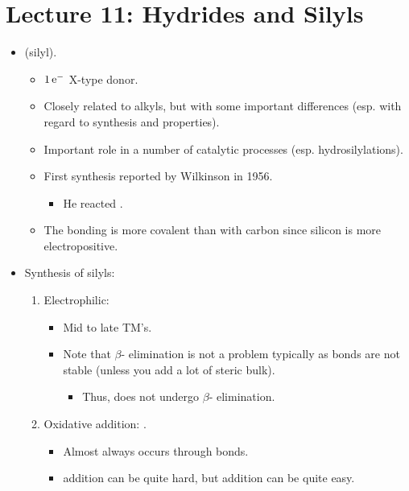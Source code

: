 \documentclass[../notes.tex]{subfiles}
\begin{document}
\section{Lecture 11: Hydrides and Silyls}
\begin{itemize}
    \item {} (silyl).
    \begin{itemize}
        \item $1\,\e[-]$ X-type donor.
        \item Closely related to alkyls, but with some important differences (esp. with regard to synthesis and properties).
        \item Important role in a number of catalytic processes (esp. hydrosilylations).
        \item First synthesis reported by Wilkinson in 1956.
        \begin{itemize}
            \item He reacted .
        \end{itemize}
        \item The bonding is more covalent than with carbon since silicon is more electropositive.
    \end{itemize}
    \item Synthesis of silyls:
    \begin{enumerate}
        \item Electrophilic:
        \begin{itemize}
            \item Mid to late TM's.
            \item Note that $\beta$- elimination is not a problem typically as  bonds are not stable (unless you add a lot of steric bulk).
            \begin{itemize}
                \item Thus,  does not undergo $\beta$- elimination.
            \end{itemize}
        \end{itemize}
        \item Oxidative addition: .
        \begin{itemize}
            \item Almost always occurs through  bonds.
            \item {} addition can be quite hard, but  addition can be quite easy.
            \begin{itemize}

\end{itemize}
\end{itemize}
\end{enumerate}
\end{itemize}
\end{document}
